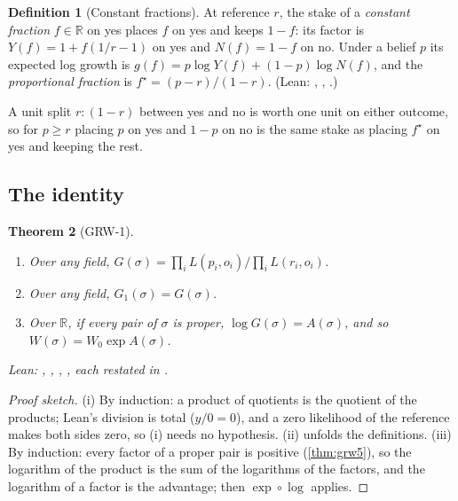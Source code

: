 \documentclass[11pt]{article}
\theoremstyle{plain}
\newtheorem{theorem}{Theorem}[section]
\theoremstyle{definition}
\newtheorem{definition}[theorem]{Definition}
\theoremstyle{remark}
\newenvironment{leannames}{\par\smallskip\small\raggedright\upshape\noindent Lean: }{\par}
\newcommand{\R}{\mathbb{R}}
\begin{document}
\begin{definition}[Constant fractions]
At reference $r$, the stake of a \emph{constant fraction} $f\in\R$ on yes places $f$ on yes and
keeps $1-f$: its factor is $Y(f)=1+f(1/r-1)$ on yes and $N(f)=1-f$ on no. Under a belief $p$ its
expected log growth is $g(f)=p\log Y(f)+(1-p)\log N(f)$, and the \emph{proportional fraction} is
$f^\star=(p-r)/(1-r)$. (Lean: , ,
.)
\end{definition}

A unit split $r:(1-r)$ between yes and no is worth one unit on either outcome, so for $p\ge r$
placing $p$ on yes and $1-p$ on no is the same stake as placing $f^\star$ on yes and keeping the
rest.

\subsection{The identity}

\begin{theorem}[GRW-1]
\label{thm:grw1}
\leavevmode
\begin{enumerate}
  \item[(i)] Over any field, $G(\sigma)=\prod_i L(p_i,o_i)\big/\prod_i L(r_i,o_i)$.
  \item[(ii)] Over any field, $G_1(\sigma)=G(\sigma)$.
  \item[(iii)] Over $\R$, if every pair of $\sigma$ is proper, $\log G(\sigma)=A(\sigma)$, and so
    $W(\sigma)=W_0\exp A(\sigma)$.
\end{enumerate}
\begin{leannames}
, , , , each
restated in .
\end{leannames}
\end{theorem}

\begin{proof}[Proof sketch]
(i) By induction: a product of quotients is the quotient of the products; Lean's division is total
($y/0=0$), and a zero likelihood of the reference makes both sides zero, so (i) needs no
hypothesis. (ii) unfolds the definitions. (iii) By induction: every factor of a proper pair is
positive (\cref{thm:grw5}), so the logarithm of the product is the sum of the logarithms of the
factors, and the logarithm of a factor is the advantage; then $\exp\circ\log$ applies.
\end{proof}
\end{document}

